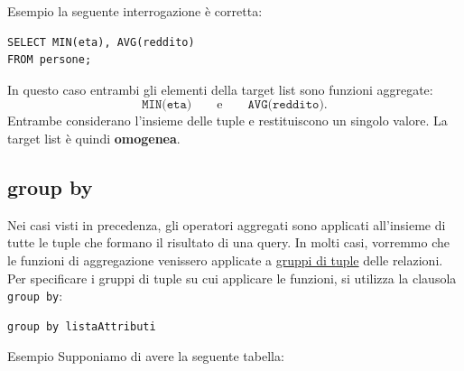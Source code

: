 \textcolor{verdeEsempio}{Esempio} la seguente interrogazione è corretta:
\begin{verbatim}
SELECT MIN(eta), AVG(reddito)
FROM persone;
\end{verbatim}
In questo caso entrambi gli elementi della target list sono funzioni
aggregate:
\[
\texttt{MIN(eta)}
\qquad\text{e}\qquad
\texttt{AVG(reddito)}.
\]
Entrambe considerano l'insieme delle tuple e restituiscono un singolo
valore. La target list è quindi \textbf{omogenea}.

\subsection{group by}
Nei casi visti in precedenza, gli operatori aggregati sono applicati all'insieme di tutte le tuple che formano il risultato di una query.
In molti casi, vorremmo che le funzioni di aggregazione venissero applicate a \underline{gruppi di tuple} delle relazioni. Per specificare i gruppi di tuple su cui applicare le funzioni, si utilizza la clausola \texttt{group by}:
\begin{verbatim}group by listaAttributi\end{verbatim}

\noindent \textcolor{verdeEsempio}{Esempio} Supponiamo di avere la seguente tabella:

